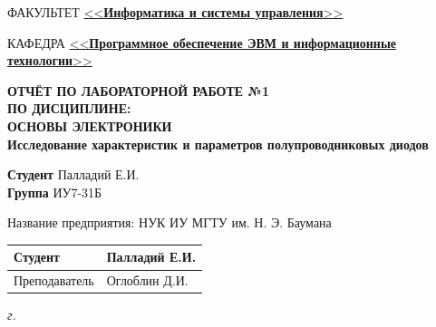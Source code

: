 \begin{titlepage}
	\begin{flushleft}
		\fontsize{12pt}{0.8\baselineskip}\selectfont 
		
		ФАКУЛЬТЕТ \uline{<<\textbf{Информатика и системы управления}>> \hfill}
		
		КАФЕДРА \uline{\mbox{\hspace{4mm}} <<\textbf{Программное обеспечение ЭВМ и информационные технологии}>> \hfill}
	\end{flushleft}
	
	\vspace{1mm}
	
	\begin{center}
		\setstretch{1.2}
		{
			\fontsize{20pt}{\baselineskip}\selectfont\bfseries
			ОТЧЁТ ПО ЛАБОРАТОРНОЙ РАБОТЕ №1 \\
			ПО ДИСЦИПЛИНЕ: \\
			ОСНОВЫ ЭЛЕКТРОНИКИ \\
		}
		\vspace{5mm}
		{
			\Large \bfseries
			Исследование характеристик и параметров
			полупроводниковых диодов\\
		}
	\end{center}
	
	\vspace{1mm}
	
	\begin{flushleft}
		\textbf{Студент} \uline{\hspace{5cm}} Палладий Е.И. \\
		\vspace{5mm}
		\textbf{Группа} \uline{\hspace{5cm}} ИУ7-31Б \\
	\end{flushleft}
	
	\vspace{40mm}
	
	\begin{flushleft}
		Название предприятия: НУК ИУ МГТУ им. Н. Э. Баумана \\
	\end{flushleft}
	
	
	\begin{flushleft}
		\begin{tabular}{|p{}|p{0.45\textwidth}|}
			\hline
			Студент & \uline{\hspace{3cm}} Палладий Е.И. \\
			\hline
			Преподаватель & \uline{\hspace{3cm}} Оглоблин Д.И. \\
			\hline
		\end{tabular}
	\end{flushleft}
	
	
	\centering\textit{{\the\year} г.}
\end{titlepage}